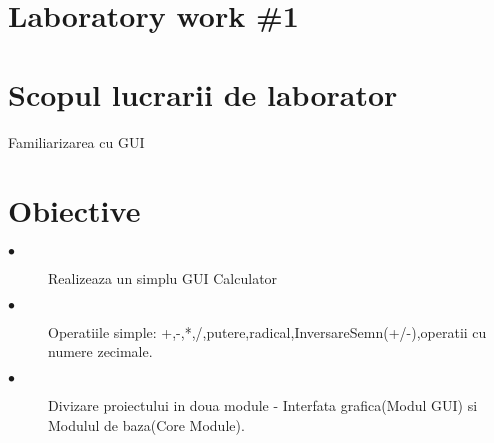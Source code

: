 \section*{Laboratory work \#1}

\section{Scopul lucrarii de laborator}
Familiarizarea cu GUI

\section{Obiective}

\begin{description}
  \item[$\bullet$] Realizeaza un simplu GUI Calculator
  \item[$\bullet$] Operatiile simple: +,-,*,/,putere,radical,InversareSemn(+/-),operatii cu numere zecimale.
  \item[$\bullet$] Divizare proiectului in doua module - Interfata grafica(Modul GUI) si Modulul de baza(Core Module).
\end{description}